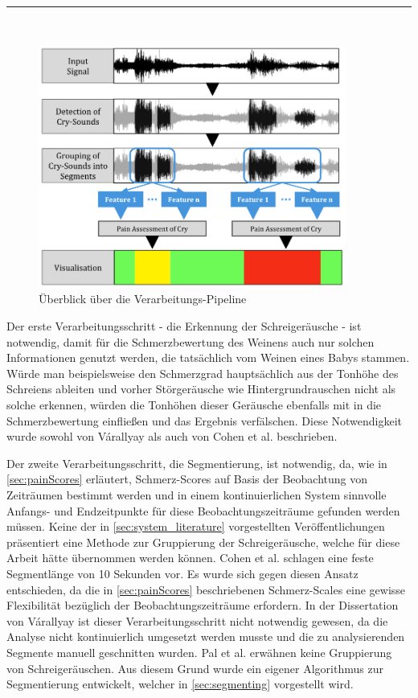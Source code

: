 \noindent\rule{\linewidth}{0.3pt} \\

\begin{figure}[h]
	\centering
	\includegraphics[width=0.9\textwidth]{bilder/konzept08.png}
	\caption{Überblick über die Verarbeitungs-Pipeline}
	\label{img:architecture-overview}
\end{figure}


Der erste Verarbeitungsschritt - die Erkennung der Schreigeräusche - ist notwendig, damit für die Schmerzbewertung des Weinens auch nur solchen Informationen genutzt werden, die tatsächlich vom Weinen eines Babys stammen. Würde man beispielsweise den Schmerzgrad hauptsächlich aus der Tonhöhe des Schreiens ableiten und vorher Störgeräusche wie Hintergrundrauschen nicht als solche erkennen, würden die Tonhöhen dieser Geräusche ebenfalls mit in die Schmerzbewertung einfließen und das Ergebnis verfälschen. Diese Notwendigkeit wurde sowohl von Várallyay \cite{cry_thesis} als auch von Cohen et al. \cite{cohenCry} beschrieben. 

Der zweite Verarbeitungsschritt, die Segmentierung, ist notwendig, da, wie in \autoref{sec:painScores} erläutert, Schmerz-Scores auf Basis der Beobachtung von Zeiträumen bestimmt werden und in einem kontinuierlichen System sinnvolle Anfangs- und Endzeitpunkte für diese Beobachtungszeiträume gefunden werden müssen. Keine der in \autoref{sec:system_literature} vorgestellten Veröffentlichungen präsentiert eine Methode zur Gruppierung der Schreigeräusche, welche für diese Arbeit hätte übernommen werden können. Cohen et al. \cite{cohenCry} schlagen eine feste Segmentlänge von 10 Sekunden vor. Es wurde sich gegen diesen Ansatz entschieden, da die in \autoref{sec:painScores} beschriebenen Schmerz-Scales eine gewisse Flexibilität bezüglich der Beobachtungszeiträume erfordern. In der Dissertation von Várallyay \cite{cry_thesis} ist dieser Verarbeitungsschritt nicht notwendig gewesen, da die Analyse nicht kontinuierlich umgesetzt werden musste und die zu analysierenden Segmente manuell geschnitten wurden. Pal et al. \cite{palEmotion} erwähnen keine Gruppierung von Schreigeräuschen. Aus diesem Grund wurde ein eigener Algorithmus zur Segmentierung entwickelt, welcher in \autoref{sec:segmenting} vorgestellt wird.

